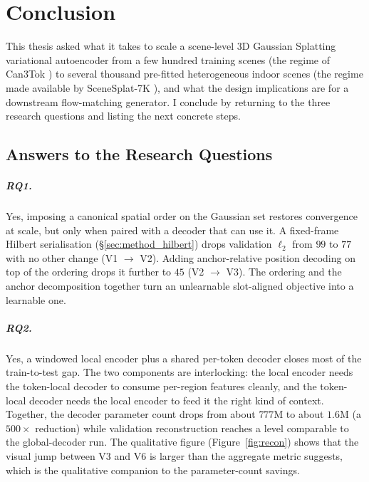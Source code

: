 \chapter{Conclusion}
\label{chap:conclusion}

This thesis asked what it takes to scale a scene-level 3D Gaussian Splatting variational autoencoder from a few hundred training scenes (the regime of Can3Tok \citep{gao2025can3tok}) to several thousand pre-fitted heterogeneous indoor scenes (the regime made available by SceneSplat-7K \citep{li2025scenesplat}), and what the design implications are for a downstream flow-matching generator. I conclude by returning to the three research questions and listing the next concrete steps.

\section{Answers to the Research Questions}
\label{sec:conc_answers}

\paragraph{RQ1.} Yes, imposing a canonical spatial order on the Gaussian set restores convergence at scale, but only when paired with a decoder that can use it. A fixed-frame Hilbert serialisation (\S\ref{sec:method_hilbert}) drops validation $\ell_2$ from $99$ to $77$ with no other change (V1 $\to$ V2). Adding anchor-relative position decoding on top of the ordering drops it further to $45$ (V2 $\to$ V3). The ordering and the anchor decomposition together turn an unlearnable slot-aligned objective into a learnable one.

\paragraph{RQ2.} Yes, a windowed local encoder plus a shared per-token decoder closes most of the train-to-test gap. The two components are interlocking: the local encoder needs the token-local decoder to consume per-region features cleanly, and the token-local decoder needs the local encoder to feed it the right kind of context. Together, the decoder parameter count drops from about $777$M to about $1.6$M (a $500\times$ reduction) while validation reconstruction reaches a level comparable to the global-decoder run. The qualitative figure (Figure~\ref{fig:recon}) shows that the visual jump between V3 and V6 is larger than the aggregate metric suggests, which is the qualitative companion to the parameter-count savings.

